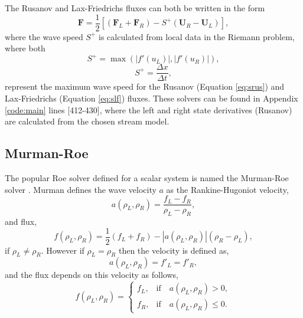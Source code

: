 	The Rusanov \cite{Rusanov61} and Lax-Friedrichs \cite{Lax54} fluxes can both be written in the form
	\begin{equation}
		\mathbf{F}=\frac{1}{2}\left[\left(\mathbf{F}_L+\mathbf{F}_R\right)-S^+\left(\mathbf{U}_R-\mathbf{U}_L\right)\right], \label{eq:Rusanov}
	\end{equation}
	where the wave speed $S^+$ is calculated from local data in the Riemann problem, where both
	\begin{equation}
		S^+=\max\left(\left|f'\left(u_L\right)\right|,\left|f'\left(u_R\right)\right|\right),\label{eq:srus}
	\end{equation}
	\begin{equation}
		S^+=\frac{\Delta x}{\Delta t},\label{eq:slf}
	\end{equation}
	represent the maximum wave speed for the Rusanov (Equation \ref{eq:srus}) and Lax-Friedrichs (Equation \ref{eq:slf}) fluxes. These solvers can be found in Appendix \ref{code:main} lines [412-430], where the left and right state derivatives (Rusanov) are calculated from the chosen stream model. 
	
\subsection{Murman-Roe}
\label{sec:MR}

	The popular Roe solver defined for a scalar system is named the Murman-Roe solver \cite{Murman74}. Murman defines the wave velocity $a$ as the Rankine-Hugoniot velocity, 
	\begin{equation}
		a\left(\rho_L,\rho_R\right)=\frac{f_L-f_R}{\rho_L-\rho_R},
	\end{equation}
	and flux,
	\begin{equation}
		f\left(\rho_{L},\rho_{R}\right)=\frac{1}{2}\left(f_{L}+f_{R}\right)-\left|a\left(\rho_L,\rho_R\right)\right|\left(\rho_{R}-\rho_{L}\right),
	\end{equation} 
	if $\rho_L\neq\rho_R$.  However if $\rho_L=\rho_R$ then the velocity is defined as,
	\begin{equation}
		a\left(\rho_L,\rho_R\right)=f'_L=f'_R,
	\end{equation}
	and the flux depends on this velocity as follows,
	\begin{equation}
		f\left(\rho_{L},\rho_{R}\right)=
			\begin{cases}
				f_L, &\text{if}\quad a\left(\rho_L,\rho_R\right)>0,\\
				f_R, &\text{if}\quad a\left(\rho_L,\rho_R\right)\leq0.
			\end{cases}
	\end{equation}

